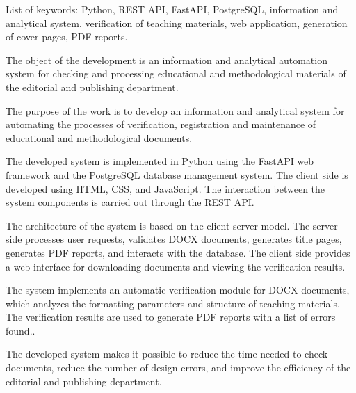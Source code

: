 List of keywords: Python, REST API, FastAPI, PostgreSQL,
information and analytical system, verification of teaching materials, web application, generation of cover pages, PDF reports.

The object of the development is an information and analytical automation system for checking and processing educational and methodological materials of the editorial and publishing department.

The purpose of the work is to develop an information and analytical system for automating the processes of verification, registration and maintenance of educational and methodological documents.

The developed system is implemented in Python using the FastAPI web framework and the PostgreSQL database management system. The client side is developed using HTML, CSS, and JavaScript. The interaction between the system components is carried out through the REST API.

The architecture of the system is based on the client-server model. The server side processes user requests, validates DOCX documents, generates title pages, generates PDF reports, and interacts with the database. The client side provides a web interface for downloading documents and viewing the verification results.

The system implements an automatic verification module for DOCX documents, which analyzes the formatting parameters and structure of teaching materials. The verification results are used to generate PDF reports with a list of errors found..

The developed system makes it possible to reduce the time needed to check documents, reduce the number of design errors, and improve the efficiency of the editorial and publishing department.
